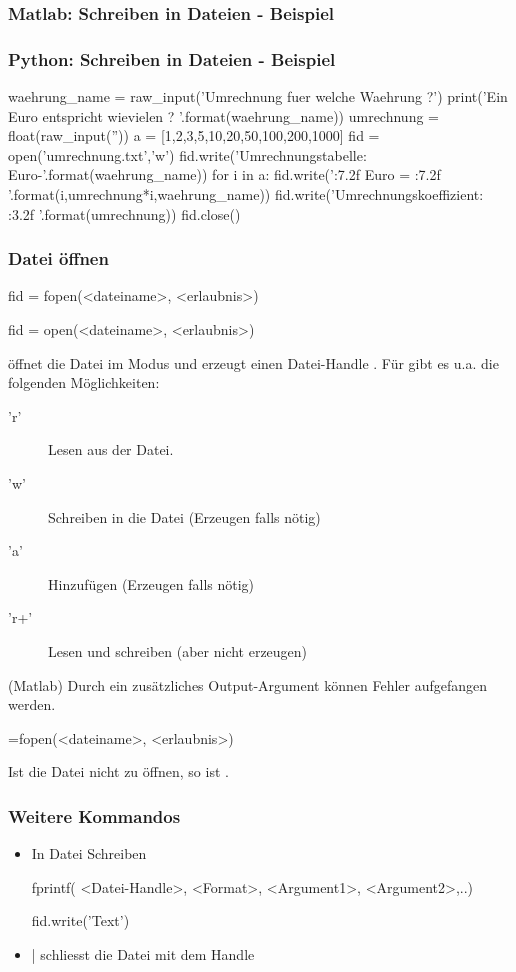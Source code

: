 \documentclass[hyperref={xetex}]{beamer}
\begin{document}
%
\begin{frame}[fragile]\frametitle{Matlab: Schreiben in Dateien - Beispiel}
\end{frame}
%
\begin{frame}[fragile]\frametitle{Python: Schreiben in Dateien - Beispiel}
  \begin{pyin}
waehrung_name = raw_input('Umrechnung fuer welche Waehrung ?')
print('Ein Euro entspricht wievielen {} ? '.format(waehrung_name))
umrechnung = float(raw_input(''))
a = [1,2,3,5,10,20,50,100,200,1000]
fid = open('umrechnung.txt','w')
fid.write('Umrechnungstabelle: Euro-{}\n\n'.format(waehrung_name))
for i in a:
  fid.write('{:7.2f} Euro = {:7.2f} {}\n'.format(i,umrechnung*i,waehrung_name))
fid.write('\n\n Umrechnungskoeffizient: {:3.2f} \n'.format(umrechnung))
fid.close()    
  \end{pyin}
\end{frame}
%
%
\begin{frame}[fragile]\frametitle{Datei öffnen}
\begin{matlabin}
fid = fopen(<dateiname>, <erlaubnis>)
\end{matlabin}
\begin{pyin}
fid = open(<dateiname>, <erlaubnis>)  
\end{pyin}

 öffnet die Datei  im Modus
   und erzeugt einen
  Datei-Handle . Für  gibt es u.a. die folgenden
  Möglichkeiten:
\begin{description}
\item ['r']  Lesen aus der Datei.
\item ['w']  Schreiben in die Datei (Erzeugen falls nötig)
\item ['a']  Hinzufügen (Erzeugen falls nötig)
\item ['r+'] Lesen und schreiben (aber nicht erzeugen) 
\end{description}
(Matlab) Durch ein  zusätzliches Output-Argument können Fehler aufgefangen
  werden. 
\begin{matlabin}
=fopen(<dateiname>, <erlaubnis>)
\end{matlabin}
Ist  die Datei nicht zu öffnen, so ist . 
\end{frame}
%
%
\begin{frame}[fragile]\frametitle{Weitere Kommandos}
\begin{itemize}
\item In Datei Schreiben
\begin{matlabin}
fprintf( <Datei-Handle>, <Format>, <Argument1>, <Argument2>,..)
\end{matlabin}
\begin{pyin}
fid.write('Text')
\end{pyin}
  \item {} |  schliesst die Datei mit dem Handle 
\end{itemize}
\end{frame}
\end{document}
